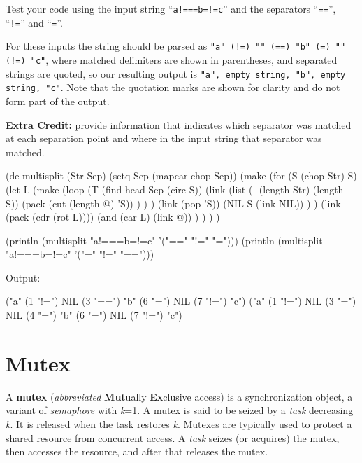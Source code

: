 Test your code using the input string ``\texttt{a!===b=!=c}'' and the
separators ``\texttt{==}'', ``\texttt{!=}'' and ``\texttt{=}''.

For these inputs the string should be parsed as
\texttt{"a" (!=) "" (==) "b" (=) "" (!=) "c"}, where matched delimiters
are shown in parentheses, and separated strings are quoted, so our
resulting output is \texttt{"a", empty string, "b", empty string, "c"}.
Note that the quotation marks are shown for clarity and do not form part
of the output.

\textbf{Extra Credit:} provide information that indicates which
separator was matched at each separation point and where in the input
string that separator was matched.


\begin{wideverbatim}

(de multisplit (Str Sep)
   (setq Sep (mapcar chop Sep))
   (make
      (for (S (chop Str) S)
         (let L
            (make
               (loop
                  (T (find head Sep (circ S))
                     (link
                        (list
                           (- (length Str) (length S))
                           (pack (cut (length @) 'S)) ) ) )
                  (link (pop 'S))
                  (NIL S (link NIL)) ) )
            (link (pack (cdr (rot L))))
            (and (car L) (link @)) ) ) ) )

(println (multisplit "a!===b=!=c" '("==" "!=" "=")))
(println (multisplit "a!===b=!=c" '("=" "!=" "==")))

Output:

("a" (1 "!=") NIL (3 "==") "b" (6 "=") NIL (7 "!=") "c")
("a" (1 "!=") NIL (3 "=") NIL (4 "=") "b" (6 "=") NIL (7 "!=") "c")

\end{wideverbatim}

\pagebreak{}
\section*{Mutex}

A \textbf{mutex} (\emph{abbreviated} \textbf{Mut}ually
\textbf{Ex}clusive access) is a synchronization object, a variant of
\emph{semaphore} with \emph{k}=1. A mutex is said to be
seized by a \emph{task} decreasing \emph{k}. It is released
when the task restores \emph{k}. Mutexes are typically used to protect a
shared resource from concurrent access. A \emph{task} seizes
(or acquires) the mutex, then accesses the resource, and after that
releases the mutex.

